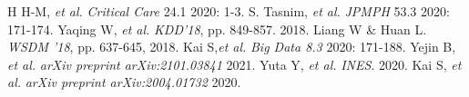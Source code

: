 {\footnotesize 
\begin{twobibliography}{99}
    \setlength{\parskip}{0cm}
    \setlength{\itemsep}{0cm}
     H H-M, \textit{et al.} \textit{Critical Care} 24.1 2020: 1-3.
     S. Tasnim, \textit{et al.} \textit{JPMPH} 53.3 2020: 171-174.
     Yaqing W, \textit{et al.} \textit{KDD'18}, pp. 849-857. 2018.
     Liang W \& Huan L. \textit{WSDM '18},  pp. 637-645, 2018.
     Kai S,\textit{et al.} \textit{Big Data 8.3} 2020: 171-188.
     Yejin B, \textit{et al.} \textit{arXiv preprint arXiv:2101.03841} 2021.
     Yuta Y, \textit{et al.} \textit{INES}. 2020.
     Kai S, \textit{et al.}  \textit{arXiv preprint arXiv:2004.01732} 2020.
\end{twobibliography}
}


